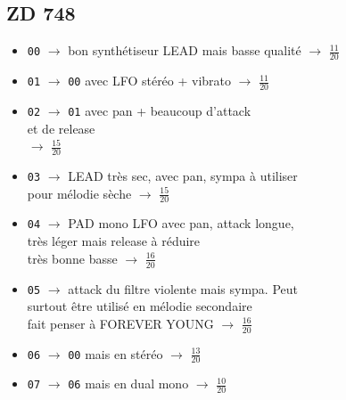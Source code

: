\documentclass[a4paper, 13pt]{article}
\begin{document}
\vspace{1cm}
\subsection*{ZD 748}
\begin{itemize}
    \item \texttt{00} $\rightarrow$ bon synthétiseur LEAD mais basse qualité $\rightarrow$ \Large{$\frac{11}{20}$} \normalsize \vspace{0.2cm}
    \item \texttt{01} $\rightarrow$ \texttt{00} avec LFO stéréo + vibrato $\rightarrow$ \Large{$\frac{11}{20}$} \normalsize \vspace{0.2cm}
    \item \texttt{02} $\rightarrow$ \texttt{01} avec pan + beaucoup d'attack \\ et de release \\ $\rightarrow$ \Large{$\frac{15}{20}$} \normalsize \vspace{0.2cm}
    \item \texttt{03} $\rightarrow$ LEAD très sec, avec pan, sympa à utiliser \\ pour mélodie sèche $\rightarrow$ \Large{$\frac{15}{20}$} \normalsize \vspace{0.2cm}
    \item \texttt{04} $\rightarrow$ PAD mono LFO avec pan, attack longue, \\très léger mais release à réduire \\très bonne basse $\rightarrow$ \Large{$\frac{16}{20}$} \normalsize \vspace{0.2cm}
    \item \texttt{05} $\rightarrow$ attack du filtre violente mais sympa. Peut \\surtout être utilisé en mélodie secondaire \\ fait penser à FOREVER YOUNG $\rightarrow$ \Large{$\frac{16}{20}$} \normalsize \vspace{0.2cm}
    \item \texttt{06} $\rightarrow$ \texttt{00} mais en stéréo $\rightarrow$ \Large{$\frac{13}{20}$} \normalsize \vspace{0.2cm}
    \item \texttt{07} $\rightarrow$ \texttt{06} mais en dual mono $\rightarrow$ \Large{$\frac{10}{20}$} \normalsize \vspace{0.2cm}
\end{itemize}


\vspace{1cm}
\end{document}
